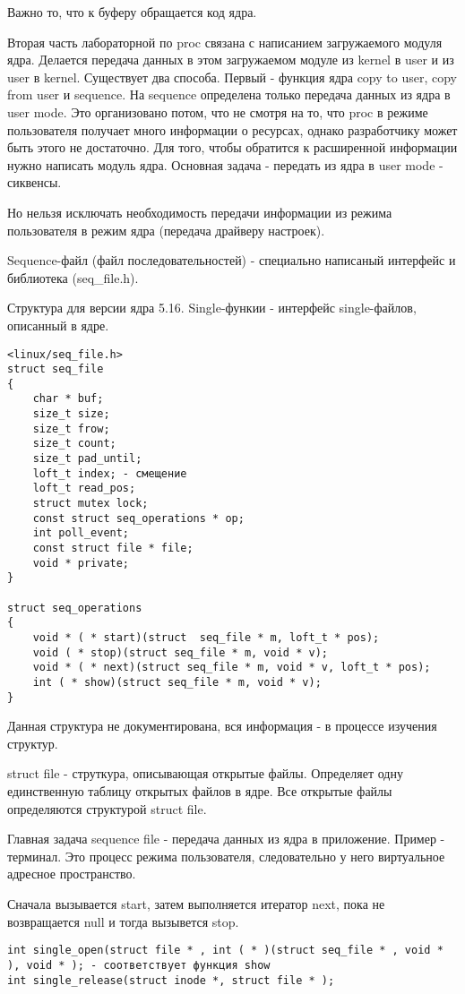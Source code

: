 Важно то, что к буферу обращается код ядра.

Вторая часть лабораторной по proc связана с написанием загружаемого модуля ядра. Делается передача данных в этом загружаемом модуле из kernel в user и из user в kernel. Существует два способа. Первый - функция ядра copy to user, copy from user и sequence. На sequence определена только передача данных из ядра в user mode. Это организовано потом, что не смотря на то, что proc в режиме пользователя получает много информации о ресурсах, однако разработчику может быть этого не достаточно. Для того, чтобы обратится к расширенной информации нужно написать модуль ядра. Основная задача - передать из ядра в user mode - сиквенсы.

Но нельзя исключать необходимость передачи информации из режима пользователя в режим ядра (передача драйверу настроек). 


Sequence-файл (файл последовательностей) - специально написаный интерфейс и библиотека (seq\_file.h).

Структура для версии ядра 5.16. Single-функии - интерфейс single-файлов, описанный в ядре.

\begin{lstlisting}
<linux/seq_file.h>
struct seq_file
{
	char * buf;
	size_t size;
	size_t frow;
	size_t count;
	size_t pad_until;
	loft_t index; - смещение
	loft_t read_pos;
	struct mutex lock;
	const struct seq_operations * op;
	int poll_event;
	const struct file * file;
	void * private;
}

struct seq_operations
{
	void * ( * start)(struct  seq_file * m, loft_t * pos);
	void ( * stop)(struct seq_file * m, void * v);
	void * ( * next)(struct seq_file * m, void * v, loft_t * pos);
	int ( * show)(struct seq_file * m, void * v);
}
\end{lstlisting}
Данная структура не документирована, вся информация - в процессе изучения структур. 

struct file - струткура, описывающая открытые файлы. Определяет одну единственную таблицу открытых файлов в ядре. Все открытые файлы определяются структурой struct file. 

Главная задача sequence file - передача данных из ядра в приложение. Пример - терминал. Это процесс режима пользователя, следовательно у него виртуальное адресное пространство. 

Сначала вызывается start, затем выполняется итератор next, пока не возвращается null и тогда вызывется stop.

\begin{lstlisting}
int single_open(struct file * , int ( * )(struct seq_file * , void * ), void * ); - соответствует функция show 
int single_release(struct inode *, struct file * );
\end{lstlisting}

